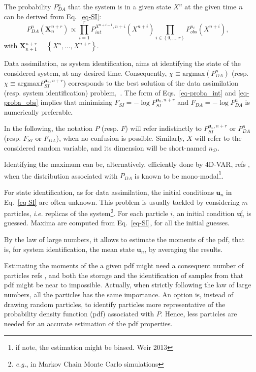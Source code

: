 \documentclass[10pt,openany,onecolumn,a4wide,pof]{article}
\newcommand{\todo}[1]{{\color{red} #1 }}
\newcommand{\gras}[1]{\boldsymbol{#1}}
\newcommand{\mypar}[1]{\left(#1\right)}
\newcommand{\mya}[1]{\left\{#1\right\}}
\newcommand{\Nphaz}{n_{\mathcal{D}}} %
\newcommand{\Np}{m}
\newcommand{\point}{\gras{u}} %
\newcommand{\rpoint}{X}
\begin{document}
The probability $P^{n}_{DA}$ that the system is in a given state $\rpoint^n$ at the given time $n$ can be derived from Eq.~\eqref{eq-SI}:
\begin{equation}
P^{n}_{DA}\mypar{\gras{\rpoint}_{n}^{n+r}} \propto \prod_{i=1}^r P^{\rpoint^{n+i-1},n+i}_{int}\mypar{\rpoint^{n+i}} \prod_{i\in \mya{0,\hdots,r}} P^{n_i}_{obs}\mypar{\rpoint^{n+i}},
\label{eq-DA}
\end{equation}
with $\gras{\rpoint}_{n+1}^{n+r} = \mya{\rpoint^{n}, \hdots,\rpoint^{n+r}}$.

Data assimilation, as system identification, aims at identifying the state of the considered system, at any desired time. 
Consequently, $\chi \equiv \text{argmax}\mypar{P^{n}_{DA}}$ (resp. $\chi \equiv \text{argmax}P^{\point_n,n+r}_{SI}$) corresponds to the best solution of the data assimilation (resp. system identification) problem,~\cite{Chorin2010,Morzfeld2012,Atkins2013}. 
The form of Eqs.~\eqref{eq-proba_int} and \eqref{eq-proba_obs} implies that minimizing $F_{SI} = -\log P^{\point_n,n+r}_{SI}$ and $F_{DA} = -\log P^{n}_{DA}$ is numerically preferable.


In the following, the notation $P$ (resp. $F$) will refer indistinctly to $P^{\point_n,n+r}_{SI}$ or $P^{n}_{DA}$ (resp. $F_{SI}$ or $F_{DA}$), when no confusion is possible. 
Similarly, $X$ will refer to the considered random variable, and its dimension will be short-named $\Nphaz$.

Identifying the maximum can be, alternatively, efficiently done by 4D-VAR, \todo{refs}, when the distribution associated with $P_{DA}$ is known to be mono-modal\footnote{if note, the estimation might be biased. Weir 2013}.

For state identification, as for data assimilation, the initial conditions $\point_n$ in Eq.~\eqref{eq-SI} are often unknown. 
This problem is usually tackled by considering $\Np$ particles, \emph{i.e.} replicas of the system\footnote{\emph{e.g.}, in Markov Chain Monte Carlo simulations}.
For each particle $i$, an initial condition $\point_n^i$ is guessed. 
Maxima are computed from Eq.~\eqref{eq-SI}, for all the initial guesses. 

By the law of large numbers, it allows to estimate the moments of the pdf, that is, for system identification, the mean state $\point_n$, by averaging the results. 


Estimating the moments of the a given pdf might need a consequent number of particles\todo{refs}, and both the storage and the identification of samples from that pdf might be near to impossible.
Actually, when strictly following the law of large numbers, all the particles has the same importance.
An option is, instead of drawing random particles, to identify particles more representative of the probability density function (pdf) associated with $P$. 
Hence, less particles are needed for an accurate estimation of the pdf properties.
\end{document}
